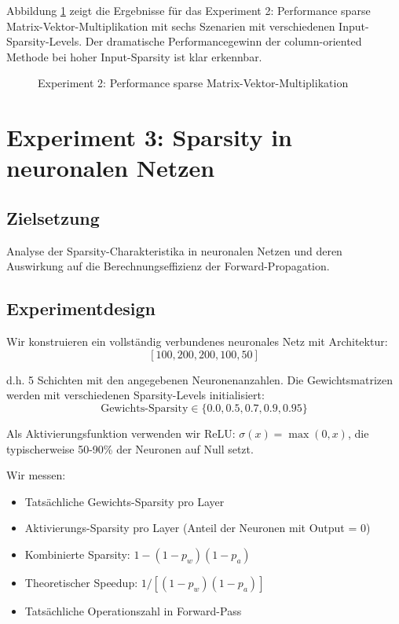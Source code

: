 \documentclass[a4paper,12pt]{report}
\theoremstyle{definition}
\begin{document}
	Abbildung \ref{fig:exp2} zeigt die Ergebnisse für das Experiment 2: Performance sparse Matrix-Vektor-Multiplikation mit sechs Szenarien mit verschiedenen Input-Sparsity-Levels. Der dramatische Performancegewinn der column-oriented Methode bei hoher Input-Sparsity ist klar erkennbar.
	
	\begin{figure}[H]
		\centering
		\caption{Experiment 2: Performance sparse Matrix-Vektor-Multiplikation}
		\label{fig:exp2}
	\end{figure}
	
	\section{Experiment 3: Sparsity in neuronalen Netzen}
	
	\subsection{Zielsetzung}
	
	Analyse der Sparsity-Charakteristika in neuronalen Netzen und deren Auswirkung auf die Berechnungseffizienz der Forward-Propagation.
	
	\subsection{Experimentdesign}
	
	Wir konstruieren ein vollständig verbundenes neuronales Netz mit Architektur:
	\[
	[100, 200, 200, 100, 50]
	\]
	
	d.h. 5 Schichten mit den angegebenen Neuronenanzahlen. Die Gewichtsmatrizen werden mit verschiedenen Sparsity-Levels initialisiert:
	\[
	\text{Gewichts-Sparsity} \in \{0.0, 0.5, 0.7, 0.9, 0.95\}
	\]
	
	Als Aktivierungsfunktion verwenden wir ReLU: $\sigma(x) = \max(0, x)$, die typischerweise 50-90\% der Neuronen auf Null setzt.
	
	Wir messen:
	\begin{itemize}
		\item Tatsächliche Gewichts-Sparsity pro Layer
		\item Aktivierungs-Sparsity pro Layer (Anteil der Neuronen mit Output = 0)
		\item Kombinierte Sparsity: $1 - (1-p_w)(1-p_a)$
		\item Theoretischer Speedup: $1/[(1-p_w)(1-p_a)]$
		\item Tatsächliche Operationszahl in Forward-Pass
	\end{itemize}
	
\end{document}
